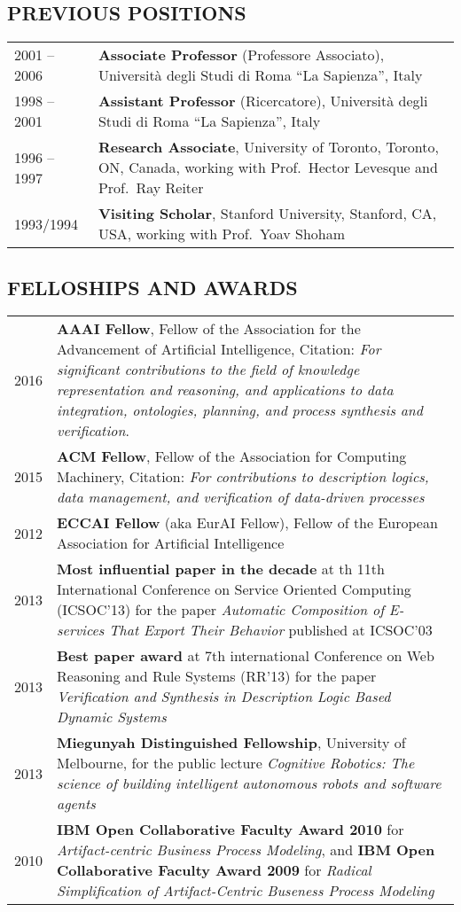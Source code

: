 \subsection*{PREVIOUS POSITIONS}
\vspace{-2ex}
\begin{tabular}{p{2cm}p{14cm}}
  2001 -- 2006\ & \textbf{Associate Professor} (Professore Associato), Universit\`a degli Studi di Roma ``La Sapienza'', Italy\\
  1998 -- 2001 & \textbf{Assistant Professor} (Ricercatore), Universit\`a degli Studi di Roma ``La Sapienza'', Italy\\
1996 -- 1997 & \textbf{Research Associate}, University of Toronto, Toronto, ON,  Canada, working with Prof.\ Hector Levesque and Prof.\ Ray Reiter\\
1993/1994 & \textbf{Visiting Scholar}, Stanford University, Stanford, CA, USA,  working with Prof.\ Yoav Shoham
\end{tabular}

\vspace{-2ex}
\subsection*{FELLOSHIPS AND AWARDS}
\vspace{-2ex}
\begin{tabular}{p{2cm}p{14cm}}
2016 & \textbf{AAAI Fellow}, Fellow of the Association for the Advancement of Artificial Intelligence,
Citation: \emph{For significant contributions to the field of knowledge representation and reasoning, and applications to data integration, ontologies, planning, and process synthesis and verification}.
\\
2015 & \textbf{ACM Fellow}, Fellow of the Association for Computing Machinery, Citation: \emph{For contributions to description logics, data management, and verification of data-driven processes}\\
2012 & \textbf{ECCAI Fellow} (aka EurAI Fellow),  Fellow of the European Association for Artificial Intelligence\\
2013 & \textbf{Most influential paper in the decade} at th 11th International Conference on Service Oriented Computing (ICSOC'13) for the paper \emph{Automatic Composition of E-services That Export Their Behavior} published at ICSOC’03\\
2013 & \textbf{Best paper award} at 7th international Conference on Web Reasoning and Rule Systems (RR'13) for the paper \emph{Verification and Synthesis in Description Logic Based Dynamic Systems}\\
2013 & \textbf{Miegunyah Distinguished Fellowship}, University of Melbourne, for the public lecture \emph{Cognitive Robotics: The science of building intelligent autonomous robots and software agents}\\
2010 & \textbf{IBM Open Collaborative Faculty Award 2010} for \emph{Artifact-centric Business Process Modeling}, and 
\textbf{IBM Open Collaborative Faculty Award 2009} for \emph{Radical Simplification of Artifact-Centric Buseness Process Modeling}
\end{tabular}

